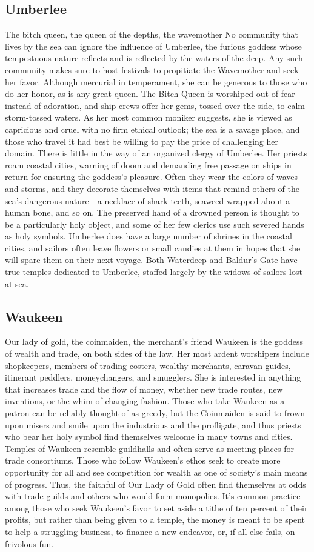 \documentclass[10pt,a4paper,twoside,twocolumn,openany,bg=print,nodeprecatedcode]{dndbook}
\begin{document}
\subsection{Umberlee}
The bitch queen, the queen of the depths, the wavemother
No community that lives by the sea can ignore the influence of Umberlee, the furious goddess whose tempestuous nature reflects and is reflected by the waters of the deep. Any such community makes sure to host festivals to propitiate the Wavemother and seek her favor. Although mercurial in temperament, she can be generous to those who do her honor, as is any great queen.
The Bitch Queen is worshiped out of fear instead of adoration, and ship crews offer her gems, tossed over the side, to calm storm-tossed waters. As her most common moniker suggests, she is viewed as capricious and cruel with no firm ethical outlook; the sea is a savage place, and those who travel it had best be willing to pay the price of challenging her domain.
There is little in the way of an organized clergy of Umberlee. Her priests roam coastal cities, warning of doom and demanding free passage on ships in return for ensuring the goddess's pleasure. Often they wear the colors of waves and storms, and they decorate themselves with items that remind others of the sea's dangerous nature—a necklace of shark teeth, seaweed wrapped about a human bone, and so on. The preserved hand of a drowned person is thought to be a particularly holy object, and some of her few clerics use such severed hands as holy symbols. Umberlee does have a large number of shrines in the coastal cities, and sailors often leave flowers or small candies at them in hopes that she will spare them on their next voyage. Both Waterdeep and Baldur's Gate have true temples dedicated to Umberlee, staffed largely by the widows of sailors lost at sea.
\subsection{Waukeen}
Our lady of gold, the coinmaiden, the merchant's friend
Waukeen is the goddess of wealth and trade, on both sides of the law. Her most ardent worshipers include shopkeepers, members of trading costers, wealthy merchants, caravan guides, itinerant peddlers, moneychangers, and smugglers. She is interested in anything that increases trade and the flow of money, whether new trade routes, new inventions, or the whim of changing fashion. Those who take Waukeen as a patron can be reliably thought of as greedy, but the Coinmaiden is said to frown upon misers and smile upon the industrious and the profligate, and thus priests who bear her holy symbol find themselves welcome in many towns and cities.
Temples of Waukeen resemble guildhalls and often serve as meeting places for trade consortiums. Those who follow Waukeen's ethos seek to create more opportunity for all and see competition for wealth as one of society's main means of progress. Thus, the faithful of Our Lady of Gold often find themselves at odds with trade guilds and others who would form monopolies. It's common practice among those who seek Waukeen's favor to set aside a tithe of ten percent of their profits, but rather than being given to a temple, the money is meant to be spent to help a struggling business, to finance a new endeavor, or, if all else fails, on frivolous fun.
\end{document}
